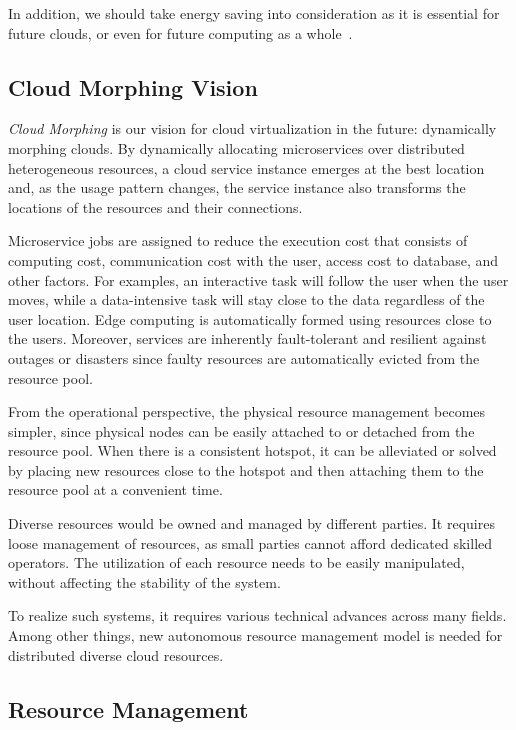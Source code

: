In addition, we should take energy saving into consideration as it is
essential for future clouds, or even for future computing as a
whole~\cite{Mastelic-2015,masanet2020recalibrating}.

\subsection{Cloud Morphing Vision}

{\em Cloud Morphing} is our vision for cloud virtualization in the future:
dynamically morphing clouds.
By dynamically allocating microservices over distributed
heterogeneous resources, a cloud service instance emerges at the best
location and, as the usage pattern changes, the service instance also
transforms the locations of the resources and their connections.

Microservice jobs are assigned to reduce the execution cost that
consists of computing cost, communication cost with the user, access
cost to database, and other factors.
For examples, an interactive task will follow the user when the user
moves, while a data-intensive task will stay close to the data
regardless of the user location.
Edge computing is automatically formed using resources close to
the users.
Moreover, services are inherently fault-tolerant and resilient
against outages or disasters since faulty resources are
automatically evicted from the resource pool.

From the operational perspective, the physical resource management
becomes simpler, since physical nodes can be easily attached to or
detached from the resource pool.
When there is a consistent hotspot, it can be alleviated or solved by
placing new resources close to the hotspot and then attaching them to
the resource pool at a convenient time.

Diverse resources would be owned and managed by different parties.
It requires loose management of resources, as small parties cannot
afford dedicated skilled operators.
The utilization of each resource needs to be easily manipulated,
without affecting the stability of the system.

To realize such systems, it requires various technical advances across
many fields.  Among other things, new autonomous resource management
model is needed for distributed diverse cloud resources.

\subsection{Resource Management}

